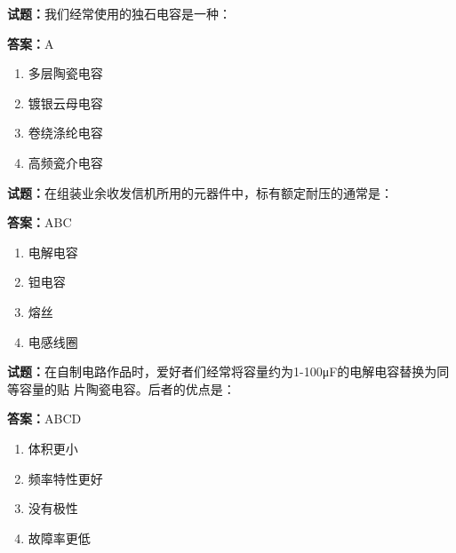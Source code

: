 \documentclass{ctexbook}
\begin{document}




\vspace{1em}

\textbf{试题：}我们经常使用的独石电容是一种： 

\textbf{答案：}A 

\begin{enumerate}[leftmargin=3em]
  \item 多层陶瓷电容 

  \item 镀银云母电容 

  \item 卷绕涤纶电容 

  \item 高频瓷介电容 

\end{enumerate}





\vspace{1em}

\textbf{试题：}在组装业余收发信机所用的元器件中，标有额定耐压的通常是： 

\textbf{答案：}ABC 

\begin{enumerate}[leftmargin=3em]
  \item 电解电容 

  \item 钽电容 

  \item 熔丝 

  \item 电感线圈 


\end{enumerate}





\vspace{1em}

\textbf{试题：}在自制电路作品时，爱好者们经常将容量约为1-100μF的电解电容替换为同等容量的贴
片陶瓷电容。后者的优点是： 

\textbf{答案：}ABCD 

\begin{enumerate}[leftmargin=3em]
  \item 体积更小 

  \item 频率特性更好 

  \item 没有极性 

  \item 故障率更低 

\end{enumerate}
\end{document}
